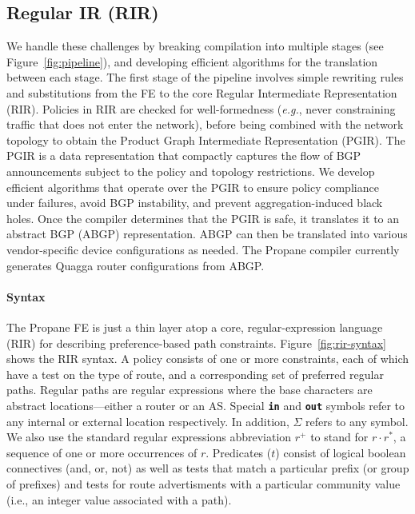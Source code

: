 \documentclass[10pt]{sigalternate052015}
\newcommand{\EG}{\emph{e.g.}}
\newcommand{\sysname}{{\small \sf Propane}\xspace}
\newcommand{\para}[1]{\paragraph*{\textbf{#1}}}
\newcommand{\CD}[1]{\texttt{\small #1}}  %
\newcommand{\KW}[1]{\texttt{\small\bfseries{#1}}}
\newcommand{\Prefer}{\texttt{>>}}
\newcommand{\Link}{\texttt{->}}
\newcommand{\In}{\KW{in}}
\newcommand{\Out}{\KW{out}}
\begin{document}
\subsection{Regular IR (RIR)}
\label{sec:rir}

We handle these challenges by breaking compilation into multiple stages (see Figure~\ref{fig:pipeline}), and developing efficient algorithms for the translation between each stage. The first stage of the pipeline involves simple rewriting rules and substitutions from the FE to the core Regular Intermediate Representation (RIR). Policies in RIR are checked for well-formedness (\EG, never constraining traffic that does not enter the network), before being combined with the network topology to obtain the Product Graph Intermediate Representation (PGIR). The PGIR is a data representation that compactly captures the flow of BGP announcements subject to the policy and topology restrictions. We develop efficient algorithms that operate over the PGIR to ensure policy compliance under failures, avoid BGP instability, and prevent aggregation-induced black holes. Once the compiler determines that the PGIR is safe, it translates it to an abstract BGP (ABGP) representation. ABGP can then be translated into various vendor-specific device
configurations as needed. The \sysname compiler currently generates 
Quagga router configurations from ABGP. 


\para{Syntax}
The \sysname FE is just a thin layer atop a core, regular-expression language (RIR) for describing preference-based path constraints. 
Figure~\ref{fig:rir-syntax} shows the RIR syntax. A policy consists of one or more constraints, each of which have a test on the type of route, and a corresponding set of preferred regular paths. Regular paths are regular expressions where the base characters are abstract locations---either a router or an AS. Special \In{} and \Out{} symbols refer to any internal or external location respectively. In addition, $\Sigma$ refers to any symbol. We also use the standard regular expressions abbreviation $r^+$ to stand for $r \cdot r^*$, a sequence of one or more occurrences of $r$. Predicates ($t$) consist of logical boolean connectives (and, or, not) as well as tests that match a particular prefix (or group of prefixes) and tests for route advertisments with a particular community value (i.e., an integer value associated with a path). 
\end{document}
